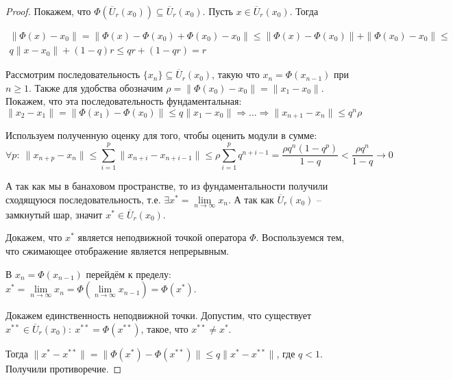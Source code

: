 \documentclass[a4paper,12pt]{article}
\renewcommand{\leq}{\ensuremath{\leqslant}}
\renewcommand{\geq}{\ensuremath{\geqslant}}
\theoremstyle{plain}
\theoremstyle{definition}
\theoremstyle{remark}
\begin{document}
\begin{proof}
	Покажем, что $\Phi(\overline{U}_r(x_0)) \subseteq \overline{U}_r(x_0)$. Пусть $x \in \overline{U}_r(x_0)$. Тогда

	\begin{align*}
		\|\Phi(x) - x_0\| = \|\Phi(x) - \Phi(x_0) + \Phi(x_0) - x_0\| \leq \|\Phi(x) - \Phi(x_0)\| + \|\Phi(x_0) - x_0\| \leq \\
		q\|x - x_0\| + (1 - q)r \leq qr + (1 - qr) = r
	\end{align*}

	Рассмотрим последовательность $\{x_n\} \subseteq \overline{U}_r(x_0)$, такую что $x_n = \Phi(x_{n - 1})$ при $n \geq 1$. Также для удобства обозначим $\rho = \|\Phi(x_0) - x_0\| = \|x_1 - x_0\|$. Покажем, что эта последовательность фундаментальная:
	\[\|x_2 - x_1\| = \|\Phi(x_1) - \Phi(x_0)\| \leq q \|x_1 - x_0\| \Rightarrow \ldots \Rightarrow \|x_{n + 1} - x_n\| \leq q^n\rho\]

	Используем полученную оценку для того, чтобы оценить модули в сумме:
	\[\forall p:\: \|x_{n + p} - x_n\| \leq \sum_{i = 1}^p \|x_{n + i} - x_{n + i - 1}\| \leq \rho \sum_{i = 1}^p q^{n + i - 1} = \frac{\rho q^n(1 - q^p)}{1 - q} < \frac{\rho q^n}{1 - q} \to 0\]

	А так как мы в банаховом пространстве, то из фундаментальности получили сходящуюся последовательность, т.е. $\exists x^* = \lim\limits_{n \to \infty} x_n$. А так как $\overline{U}_r(x_0)$ -- замкнутый шар, значит $x^* \in \overline{U}_r(x_0)$.

	Докажем, что $x^*$ является неподвижной точкой оператора $\Phi$. Воспользуемся тем, что сжимающее отображение является непрерывным.

	В $x_n = \Phi(x_{n - 1})$ перейдём к пределу: $x^* = \lim\limits_{n \to \infty} x_n = \Phi\left(\lim\limits_{n \to \infty} x_{n - 1}\right) = \Phi(x^*)$.

	Докажем единственность неподвижной точки. Допустим, что существует $x^{**} \in \overline{U}_r(x_0):\: x^{**} = \Phi(x^{**})$, такое, что $x^{**} \neq x^*$.

	Тогда $\|x^* - x^{**}\| = \|\Phi(x^*) - \Phi(x^{**})\| \leq q\|x^* - x^{**}\|$, где $q < 1$. Получили противоречие.
\end{proof}
\end{document}
